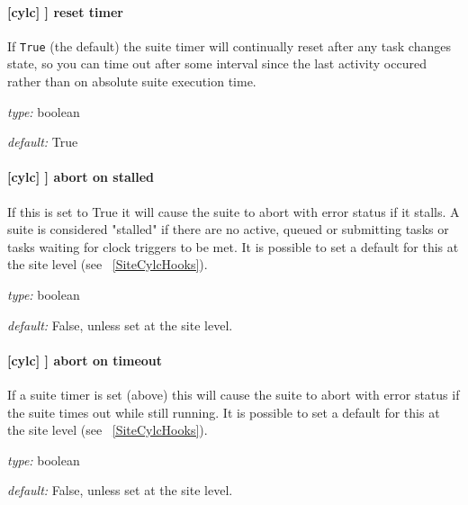 \paragraph[reset timer]{[cylc] \textrightarrow [[events]] \textrightarrow reset timer}

If \lstinline=True= (the default) the suite timer will continually reset
after any task changes state, so you can time out after some interval
since the last activity occured rather than on absolute suite execution
time.

\begin{myitemize}
    \item {\em type:} boolean
    \item {\em default:} True
\end{myitemize}

\paragraph[abort on stalled]{[cylc] \textrightarrow [[events]] \textrightarrow abort on stalled}

If this is set to True it will cause the suite to abort with error status
if it stalls. A suite is considered "stalled" if there are no active,
queued or submitting tasks or tasks waiting for clock triggers to be met. It is
possible to set a default for this at the site level
(see ~\ref{SiteCylcHooks}).

\begin{myitemize}
    \item {\em type:} boolean
    \item {\em default:} False, unless set at the site level.
\end{myitemize}

\paragraph[abort on timeout]{[cylc] \textrightarrow [[events]] \textrightarrow abort on timeout}

If a suite timer is set (above) this will cause the suite to abort with
error status if the suite times out while still running. It is possible to set 
a default for this at the site level (see ~\ref{SiteCylcHooks}).

\begin{myitemize}
    \item {\em type:} boolean
    \item {\em default:} False, unless set at the site level.
\end{myitemize}


